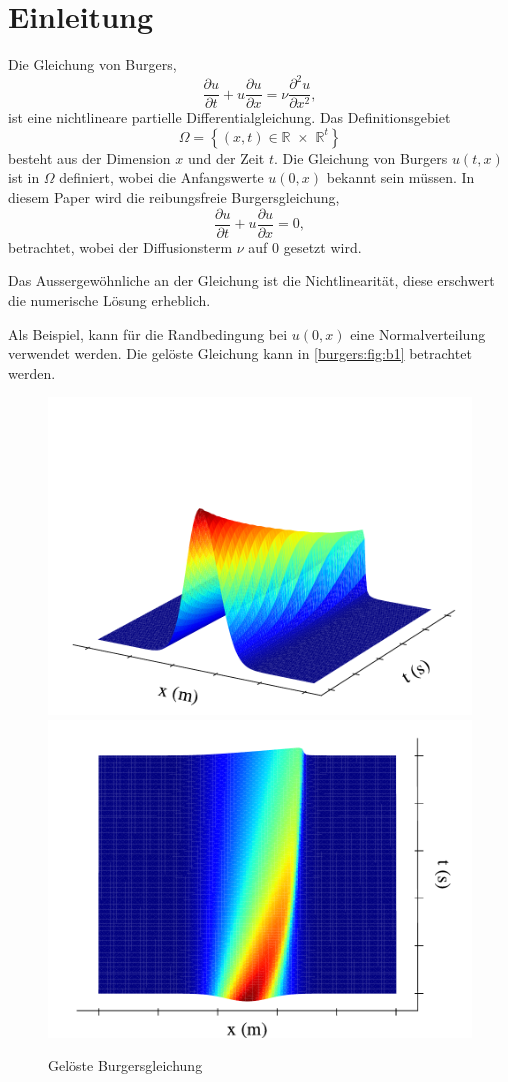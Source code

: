 %
%
\section{Einleitung \label{burgers:section:einleitung}}

	Die Gleichung von Burgers,
	\begin{equation}
		  \frac {\partial u}{\partial t}+u{\frac {\partial u}{\partial x}}=\nu {\frac {\partial ^{2}u}{\partial x^{2}}},
		  \label{burgers:eq_burgers}
	\end{equation}
	ist eine nichtlineare partielle Differentialgleichung.
	Das Definitionsgebiet
	\begin{equation}
		\Omega = \left \{ (x,t) \in  \mathbb{R} \,\, \times \,\,  \mathbb{R}^t \right \}
	\end{equation}
	besteht aus der Dimension $x$ und der Zeit $t$.
	Die Gleichung von Burgers $u(t,x)$ ist in $\Omega$ definiert, wobei die Anfangswerte $u(0,x)$ bekannt sein müssen.
	In diesem Paper wird die reibungsfreie Burgersgleichung,
	\begin{equation}
		\frac {\partial u}{\partial t}+u{\frac {\partial u}{\partial x}}=0,
		\label{burgers:eq_invisid_burgers}
	\end{equation}
	betrachtet, wobei der Diffusionsterm $\nu$ auf 0 gesetzt wird.


	Das Aussergewöhnliche an der Gleichung ist die Nichtlinearität, diese erschwert die numerische L\"osung erheblich.

	Als Beispiel, kann f\"ur die Randbedingung bei $u(0,x)$ eine Normalverteilung verwendet werden.
	Die gel\"oste Gleichung kann in \autoref{burgers:fig:b1} betrachtet werden.

	    \begin{figure}
		\centering
		\includegraphics[width=.49\textwidth]{papers/burgers/BurgersEquation/images/Implicit_front.pdf}
		\includegraphics[width=.49\textwidth]{papers/burgers/BurgersEquation/images/Implicit_top.pdf}
		\caption{Gel\"oste Burgersgleichung}
		\label{burgers:fig:b1}
		\end{figure}



